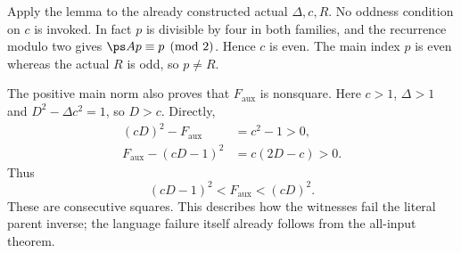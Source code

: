 \documentclass[11pt,letterpaper]{article}
\theoremstyle{definition}\newtheorem{definition}[theorem]{Definition}
\theoremstyle{remark}\newtheorem{remark}[theorem]{Remark}
\newcommand{\D}{\Delta}
\newcommand{\Fa}{F_{\mathrm{aux}}}\newcommand{\Ua}{U_{\mathrm{aux}}}\newcommand{\ttt}{t_{\mathrm{tr}}}
\begin{document}
Apply the lemma to the already constructed actual $\D,c,R$.
No oddness condition on $c$ is invoked. In fact $p$ is divisible
by four in both families, and the recurrence modulo two gives
$\ps A p\equiv p\pmod2$. Hence $c$ is even. The main index $p$
is even whereas the actual $R$ is odd, so $p\ne R$.

The positive main norm also proves that $\Fa$ is nonsquare.
Here $c>1$, $\D>1$ and $D^2-\D c^2=1$, so $D>c$. Directly,
\begin{align}
(cD)^2-\Fa&=c^2-1>0,\\
\Fa-(cD-1)^2&=c(2D-c)>0.
\label{fup:sp:eq:nonsquare}
\end{align}
Thus
\begin{equation}
(cD-1)^2<\Fa<(cD)^2.
\label{fup:sp:eq:nonsquareinterval}
\end{equation}
These are consecutive squares. This describes how the witnesses
fail the literal parent inverse; the language failure itself
already follows from the all-input theorem.
\end{document}
